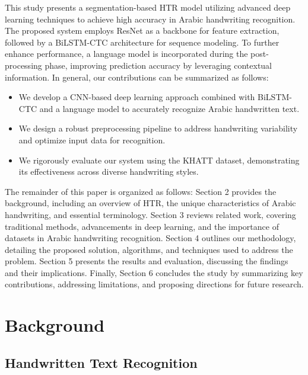 \documentclass[conference]{IEEEtran}
\begin{document}
This study presents a segmentation-based HTR model utilizing advanced deep learning techniques to achieve high accuracy in Arabic handwriting recognition. The proposed system employs ResNet as a backbone for feature extraction, followed by a BiLSTM-CTC architecture for sequence modeling. To further enhance performance, a language model is incorporated during the post-processing phase, improving prediction accuracy by leveraging contextual information. In general, our contributions can be summarized as follows:


\begin{itemize}
    \item We develop a CNN-based deep learning approach combined with BiLSTM-CTC and a language model to accurately recognize Arabic handwritten text.
    \item We design a robust preprocessing pipeline to address handwriting variability and optimize input data for recognition.
    \item We rigorously evaluate our system using the KHATT dataset, demonstrating its effectiveness across diverse handwriting styles.
\end{itemize}

The remainder of this paper is organized as follows: Section 2 provides the background, including an overview of HTR, the unique characteristics of Arabic handwriting, and essential terminology. Section 3 reviews related work, covering traditional methods, advancements in deep learning, and the importance of datasets in Arabic handwriting recognition. Section 4 outlines our methodology, detailing the proposed solution, algorithms, and techniques used to address the problem. Section 5 presents the results and evaluation, discussing the findings and their implications. Finally, Section 6 concludes the study by summarizing key contributions, addressing limitations, and proposing directions for future research.


\section{Background}











\subsection{Handwritten Text Recognition}
\end{document}
